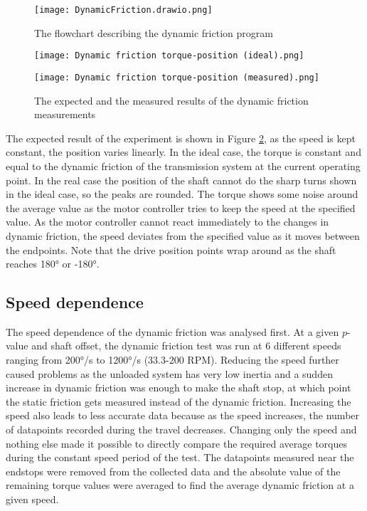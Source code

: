\documentclass[12pt]{article}
\begin{document}
\begin{figure}[h]
    \centering
    \texttt{[image: DynamicFriction.drawio.png]}
    \caption{The flowchart describing the dynamic friction program}
    \label{fig:dynamicFricFlowChart}
\end{figure}

\begin{figure}[h]
\label{fig:dynamicFrictionTorque-position}
    \centering
    \begin{minipage}{0.49\textwidth}       
         \texttt{[image: Dynamic friction torque-position (ideal).png]}
    \end{minipage}
    \begin{minipage}{0.49\textwidth}       
         \texttt{[image: Dynamic friction torque-position (measured).png]}
    \end{minipage}
\caption{The expected and the measured results of the dynamic friction measurements}
\end{figure}

The expected result of the experiment is shown in Figure \ref{fig:dynamicFrictionTorque-position}, as the speed is kept constant, the position varies linearly. In the ideal case, the torque is constant and equal to the dynamic friction of the transmission system at the current operating point. In the real case the position of the shaft cannot do the sharp turns shown in the ideal case, so the peaks are rounded. The torque shows some noise around the average value as the motor controller tries to keep the speed at the specified value. As the motor controller cannot react immediately to the changes in dynamic friction, the speed deviates from the specified value as it moves between the endpoints. Note that the drive position points wrap around as the shaft reaches 180° or -180°.


\subsection{Speed dependence}
The speed dependence of the dynamic friction was analysed first. At a given $p$-value and shaft offset, the dynamic friction test was run at 6 different speeds ranging from 200°/s to 1200°/s (33.3-200 RPM). Reducing the speed further caused problems as the unloaded system has very low inertia and a sudden increase in dynamic friction was enough to make the shaft stop, at which point the static friction gets measured instead of the dynamic friction. Increasing the speed also leads to less accurate data because as the speed increases, the number of datapoints recorded during the travel decreases. Changing only the speed and nothing else made it possible to directly compare the required average torques during the constant speed period of the test. The datapoints measured near the endstops were removed from the collected data and the absolute value of the remaining torque values were averaged to find the average dynamic friction at a given speed. \\
\end{document}
